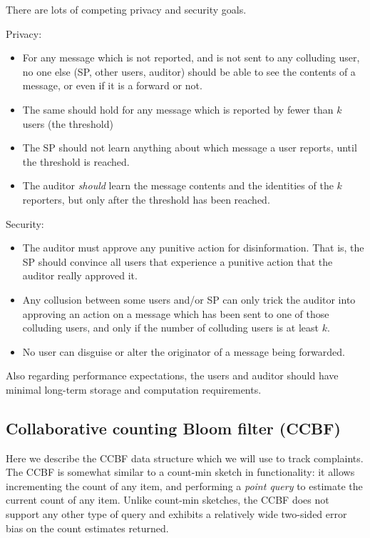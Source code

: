 \documentclass[letterpaper,12pt]{article}
\begin{document}
There are lots of competing privacy and security goals.

Privacy:
\begin{itemize}
  \item For any message which is not reported,
    and is not sent to any colluding user,
    no one else (SP, other users, auditor) should be able to see the
    contents of a message, or even if it is a forward or not.
  \item The same should hold for any message which is reported by fewer
    than $k$ users (the threshold)
  \item The SP should not learn anything about which message a user
    reports, until the threshold is reached.
  \item The auditor \emph{should} learn the message contents and the
    identities of the $k$ reporters, but only after the threshold has been
    reached.
\end{itemize}

Security:
\begin{itemize}
  \item The auditor must approve any punitive action for disinformation.
    That is, the SP should convince all users that experience a punitive
    action that the auditor really approved it.
  \item Any collusion between some users and/or SP can only trick the
    auditor into approving an action on a
    message which has been sent to one of those colluding users, and only
    if the number of colluding users is at least $k$.
  \item No user can disguise or alter the originator of a message being
    forwarded.
\end{itemize}

Also regarding performance expectations, the users and auditor should
have minimal long-term storage and computation requirements.

\subsection{Collaborative counting Bloom filter (CCBF)}\label{sec:ctbf}

Here we describe the CCBF data structure which we will use to track
complaints. The CCBF is somewhat similar to a count-min sketch in functionality:
it allows incrementing the count of any item, and performing a
\emph{point query} to estimate the current count of any item.
Unlike count-min sketches, the CCBF does not support any other
type of query and exhibits a relatively wide two-sided error bias on the
count estimates returned.
\end{document}
